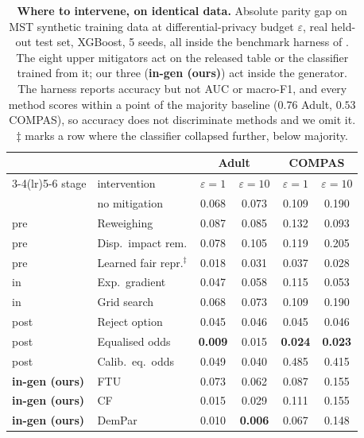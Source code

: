 \begin{table}[t]
\centering\footnotesize
\caption{\textbf{Where to intervene, on identical data.} Absolute parity gap
on MST synthetic training data at differential-privacy budget $\varepsilon$,
real held-out test set, XGBoost, 5 seeds, all inside the benchmark harness
of \citet{angelozzi2026where}. The eight upper mitigators act on the
released table or the classifier trained from it; our three
(\textbf{in-gen (ours)}) act inside the generator. The harness reports
accuracy but not AUC or macro-F1, and every method scores within a point of
the majority baseline ($0.76$ Adult, $0.53$ COMPAS), so accuracy does not
discriminate methods and we omit it. $\ddagger$ marks a row where the
classifier collapsed further, below majority.}
\label{tab:baselines}
\begin{tabular}{llcccc}
\toprule
 & & \multicolumn{2}{c}{Adult} & \multicolumn{2}{c}{COMPAS} \\
\cmidrule(lr){3-4}\cmidrule(lr){5-6}
stage & intervention & $\varepsilon{=}1$ & $\varepsilon{=}10$ & $\varepsilon{=}1$ & $\varepsilon{=}10$ \\
\midrule
 & no mitigation                     & 0.068 & 0.073 & 0.109 & 0.190 \\
\addlinespace[2pt]
pre  & Reweighing                    & 0.087 & 0.085 & 0.132 & 0.093 \\
pre  & Disp.\ impact rem.            & 0.078 & 0.105 & 0.119 & 0.205 \\
pre  & Learned fair repr.$^\ddagger$ & 0.018 & 0.031 & 0.037 & 0.028 \\
\addlinespace[2pt]
in   & Exp.\ gradient                & 0.047 & 0.058 & 0.115 & 0.053 \\
in   & Grid search                   & 0.068 & 0.073 & 0.109 & 0.190 \\
\addlinespace[2pt]
post & Reject option                 & 0.045 & 0.046 & 0.045 & 0.046 \\
post & Equalised odds                & \textbf{0.009} & 0.015 & \textbf{0.024} & \textbf{0.023} \\
post & Calib.\ eq.\ odds             & 0.049 & 0.040 & 0.485 & 0.415 \\
\addlinespace[2pt]
\textbf{in-gen (ours)} & FTU         & 0.073 & 0.062 & 0.087 & 0.155 \\
\textbf{in-gen (ours)} & CF          & 0.015 & 0.029 & 0.111 & 0.155 \\
\textbf{in-gen (ours)} & DemPar      & 0.010 & \textbf{0.006} & 0.067 & 0.148 \\
\bottomrule
\end{tabular}
\end{table}
